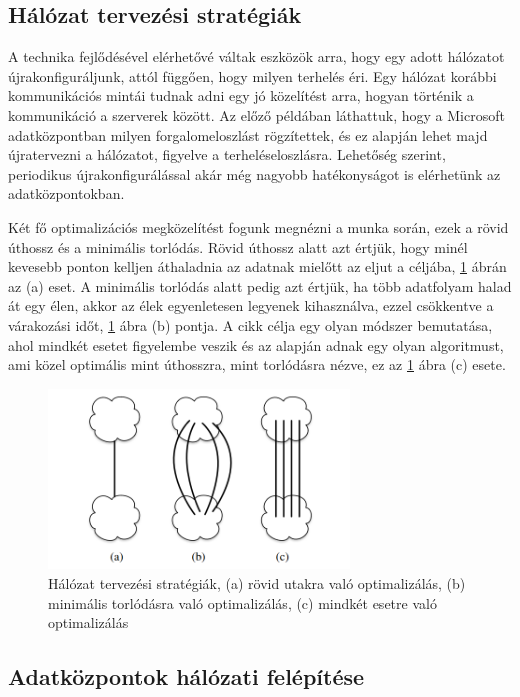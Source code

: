\documentclass[12pt]{report}
\begin{document}
\subsection{Hálózat tervezési stratégiák}

A technika fejlődésével elérhetővé váltak eszközök arra, hogy egy adott hálózatot újrakonfiguráljunk, attól függően, hogy milyen terhelés éri.
Egy hálózat korábbi kommunikációs mintái tudnak adni egy jó közelítést arra, hogyan történik a kommunikáció a szerverek között.
Az előző példában láthattuk, hogy a Microsoft adatközpontban milyen forgalomeloszlást rögzítettek, 
és ez alapján lehet majd újratervezni a hálózatot, figyelve a terheléseloszlásra.
Lehetőség szerint, periodikus újrakonfigurálással akár még nagyobb hatékonyságot is elérhetünk az adatközpontokban.

Két fő optimalizációs megközelítést fogunk megnézni a munka során, ezek a rövid úthossz és a minimális torlódás.
Rövid úthossz alatt azt értjük, hogy minél kevesebb ponton kelljen áthaladnia az adatnak mielőtt az eljut a céljába, \ref{network_strategies} ábrán az (a) eset.
A minimális torlódás alatt pedig azt értjük, ha több adatfolyam halad át egy élen, akkor az élek egyenletesen legyenek kihasználva, ezzel csökkentve a várakozási időt, \ref{network_strategies} ábra (b) pontja.
A cikk célja egy olyan módszer bemutatása, ahol mindkét esetet figyelembe veszik és az alapján adnak egy olyan algoritmust, ami közel optimális mint úthosszra, mint torlódásra nézve, ez az \ref{network_strategies} ábra (c) esete.


\begin{figure}[h]
	\centering
	\includegraphics[width=8cm]{pictures/optimalshemes.png}
	\caption{Hálózat tervezési stratégiák, (a) rövid utakra való optimalizálás, (b) minimális torlódásra való optimalizálás, (c) mindkét esetre való optimalizálás \cite{avin_demand-aware_nodate}}
	\label{network_strategies}
\end{figure}

\subsection{Adatközpontok hálózati felépítése}
\end{document}
